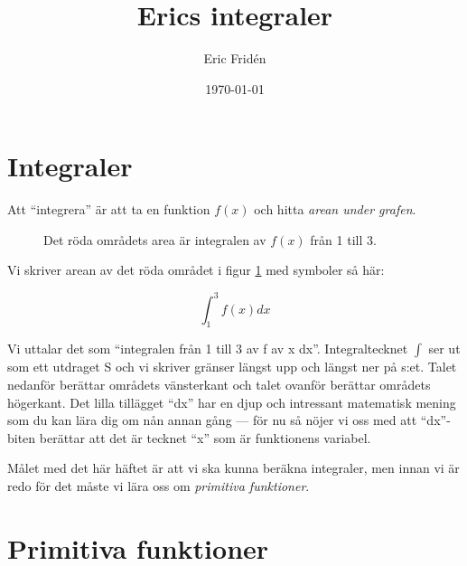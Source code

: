 \documentclass[a4paper, 12pt]{article}
\title{Erics integraler}
\author{Eric Fridén}
\date{\today}
\begin{document}
\doublespacing
\maketitle

\intro

\section{Integraler}
Att ``integrera'' är att ta en funktion $f(x)$ och hitta \emph{arean under grafen}. 

\begin{figure}[h]
    \centering
    \caption{Det röda områdets area är integralen av $f(x)$ från 1 till 3.}
    \label{fig:1}
\end{figure}

Vi skriver arean av det röda området i figur \ref{fig:1} med symboler så här: 

\[ \int_1^3 f(x)dx \] 

Vi uttalar det som ``integralen från 1 till 3 av f av x dx''. Integraltecknet $\int$ ser ut som ett utdraget S och vi skriver gränser längst upp och längst ner på s:et. Talet nedanför berättar områdets vänsterkant och talet ovanför berättar områdets högerkant. Det lilla tillägget ``dx'' har en djup och intressant matematisk mening som du kan lära dig om nån annan gång --- för nu så nöjer vi oss med att ``dx''-biten berättar att det är tecknet ``x'' som är funktionens variabel.

Målet med det här häftet är att vi ska kunna beräkna integraler, men innan vi är redo för det måste vi lära oss om \emph{primitiva funktioner}.

\section{Primitiva funktioner}
\end{document}
